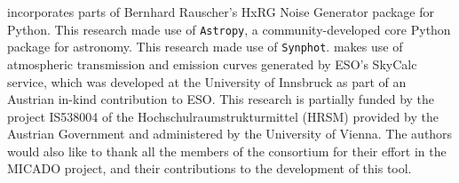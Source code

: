 
\ScopeSim{} incorporates parts of Bernhard Rauscher's HxRG Noise Generator package for Python\cite{nghxrg}.
This research made use of \lstinline{Astropy}, a community-developed core Python package for astronomy\cite{astropy1, astropy2}.
This research made use of \lstinline{Synphot}\cite{synphot}.
\ScopeSim{} makes use of atmospheric transmission and emission curves generated by ESO's SkyCalc service, which was developed at the University of Innsbruck as part of an Austrian in-kind contribution to ESO.
This research is partially funded by the project IS538004 of the Hochschulraumstrukturmittel (HRSM) provided by the Austrian Government and administered by the University of Vienna.
The authors would also like to thank all the members of the consortium for their effort in the MICADO project, and their contributions to the development of this tool.
